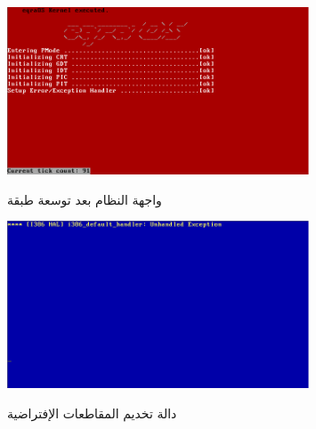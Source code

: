\documentclass[document.tex]{subfiles}
\begin{document}
\begin{figure}[h!]
  \caption{واجهة النظام بعد توسعة طبقة }
  \centering
   \includegraphics[width=0.8\textwidth]{../img/irq}
  \label{fig:irq} 
\end{figure}


\begin{figure}[h!]
  \caption{دالة تخديم المقاطعات الإفتراضية}
  \centering
   \includegraphics[width=0.8\textwidth]{../img/default_irq}
  \label{fig:default_irq} 
\end{figure}
\end{document}
